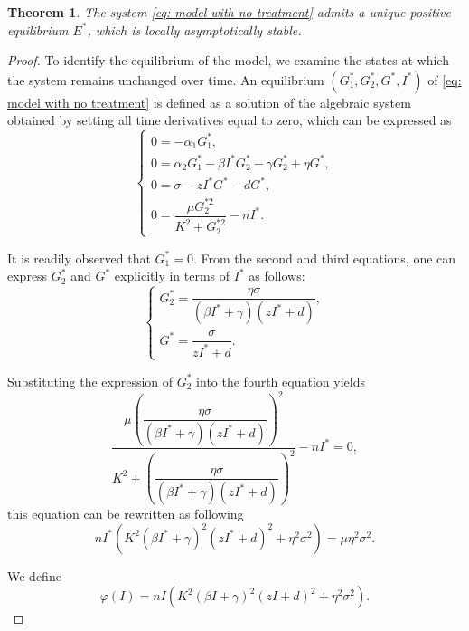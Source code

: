 \documentclass[a4paper,fleqn]{cas-sc}
\numberwithin{equation}{section}
\numberwithin{equation}{section}
\newcommand{\1}{\boldsymbol{1}}
\newcommand{\0}{\boldsymbol{0}}
\newtheorem{theorem}{Theorem}[section]
\begin{document}
\begin{theorem}
The system \eqref{eq: model with no treatment} admits a unique positive equilibrium $E^*$, which is locally asymptotically stable.
\end{theorem}
\begin{proof}
To identify the equilibrium of the model, we examine the states at which the system remains unchanged over time. An equilibrium \((G_1^*,G_2^*, G^*, I^*)\) of \eqref{eq: model with no treatment} is defined as a solution of the algebraic system obtained by setting all time derivatives equal to zero, which can be expressed as
\[
    \begin{cases}
        0 = -\alpha_1 G_1^*, \\
        0 = \alpha_2 G_1^* - \beta I^* G_2^* - \gamma G_2^* + \eta G^*,\\
        0 = \sigma - z I^* G^* - dG^*, \\
        0 = \dfrac{\mu G_2^{*2}}{K^2 + G_2^{*2}} - nI^*.
    \end{cases}
\]

It is readily observed that \(G_1^* = 0\). From the second and third equations, one can express \(G_2^*\) and \(G^*\) explicitly in terms of \(I^*\) as follows:
\[
\begin{cases}
    G_2^*= \dfrac{\eta\sigma}{(\beta I^* +\gamma)(zI^*+d)},\\
    G^*= \dfrac{\sigma}{zI^*+d}.
\end{cases}
\]

Substituting the expression of \(G_2^*\) into the fourth equation yields
\[
\dfrac{\mu \left(\dfrac{\eta\sigma}{(\beta I^* +\gamma)(zI^*+d)}\right)^2}{K^2 + \left(\dfrac{\eta\sigma}{(\beta I^* +\gamma)(zI^*+d)}\right)^2} - nI^* =0,
\]
this equation can be rewritten as following
\[
nI^*\left(K^2(\beta I^* +\gamma)^2(zI^*+d)^2 +\eta^2 \sigma^2\right) = \mu\eta^2\sigma^2.
\]

We define
\[
\varphi(I) = nI\left(K^2(\beta I +\gamma)^2(zI+d)^2 +\eta^2 \sigma^2\right).
\]


\end{proof}
\end{document}
